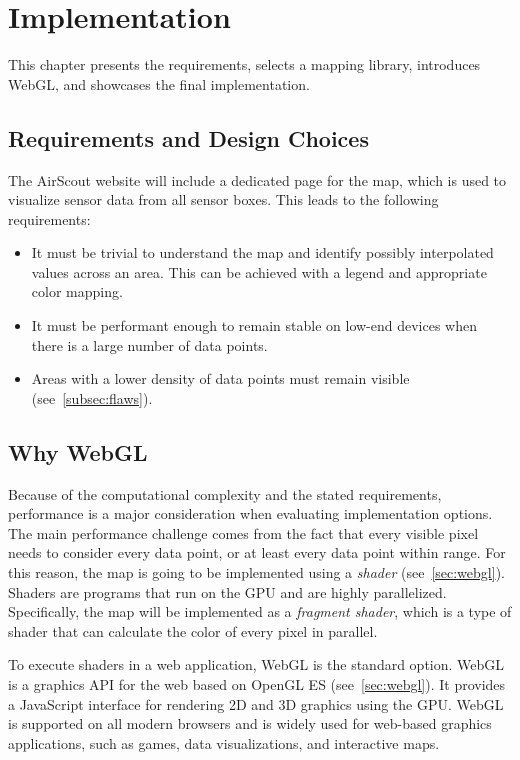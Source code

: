 \chapter{Implementation}\label{ch:implementation}
This chapter presents the requirements, selects a mapping library, introduces WebGL, and showcases the final implementation.

\section{Requirements and Design Choices}

The AirScout website will include a dedicated page for the map, which is used to visualize sensor data from all sensor boxes. This leads to the following requirements:
\begin{itemize}
    \item It must be trivial to understand the map and identify possibly interpolated values across an area. This can be achieved with a legend and appropriate color mapping.
    \item It must be performant enough to remain stable on low-end devices when there is a large number of data points.
    \item Areas with a lower density of data points must remain visible\\ (see\ \autoref{subsec:flaws}).
\end{itemize}

\section{Why WebGL}

Because of the computational complexity and the stated requirements, performance is a major consideration when evaluating implementation options. The main performance challenge comes from the fact that every visible pixel needs to consider every data point, or at least every data point within range. For this reason, the map is going to be implemented using a \emph{shader} (see\ \autoref{sec:webgl}). Shaders are programs that run on the GPU and are highly parallelized. Specifically, the map will be implemented as a \emph{fragment shader}, which is a type of shader that can calculate the color of every pixel in parallel.

To execute shaders in a web application, WebGL is the standard option. WebGL is a graphics API for the web based on OpenGL ES (see\ \autoref{sec:webgl}). It provides a JavaScript interface for rendering 2D and 3D graphics using the GPU\@. WebGL is supported on all modern browsers and is widely used for web-based graphics applications, such as games, data visualizations, and interactive maps.

